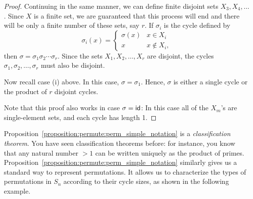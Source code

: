 \begin{proof}
Continuing in
the same manner, we can define finite disjoint sets $X_3, X_4, \ldots$.
Since $X$ is a finite set, we are guaranteed that this process will
end and there will be only a finite number of these sets, say $r$. If
$\sigma_i$ is the cycle defined by 
\[
\sigma_i( x )
= \left\{
\begin{array}{ll}
\sigma( x ) & x \in X_i \\
x & x \notin X_i,
\end{array}
\right.
\]
then $\sigma = \sigma_1 \sigma_2 \cdots \sigma_r$. Since the sets
$X_1, X_2, \ldots, X_r$ are disjoint, the cycles $\sigma_1, \sigma_2,
\ldots, \sigma_r$ must also be disjoint.  

Now recall case (i) above. In this case,  $\sigma = \sigma_1$.  Hence, $\sigma$ is either a single cycle or the product of $r$ disjoint cycles.

Note that this proof also works in case $\sigma = {\sf{i}d}$: In this case all of the $X_m$'s are single-element sets, and each cycle has length 1.
\end{proof}
\medskip

Proposition~\ref{proposition:permute:perm_simple_notation} is a \emph{classification theorem}. You have seen classification theorems before: for instance, you know that any natural number $>1$ can be written uniquely as the product of primes.  Proposition~\ref{proposition:permute:perm_simple_notation} similarly gives us a standard way to represent permutations. It allows us to characterize the types of permutations in $S_n$ according to their cycle sizes, as shown in the following example.

